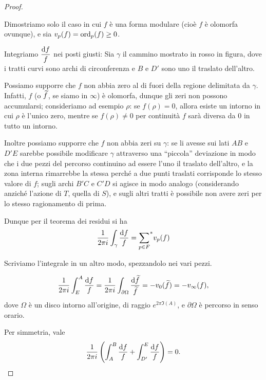 \begin{proof}
	\begin{figure}
		
	\end{figure}
	Dimostriamo solo il caso in cui $f$ è una forma modulare (cioè $f$ è olomorfa ovunque), e sia $v_p(f)=\text{ord}_p(f)\geq0$.
	
	Integriamo $\displaystyle \frac{\text{d} f}{f}$ nei posti giusti: Sia $\gamma$ il cammino mostrato in rosso in figura, dove i tratti curvi sono archi di circonferenza e $B$ e $D'$ sono uno il traslato dell'altro.
	
	Possiamo supporre che $f$ non abbia zero al di fuori della regione delimitata da $\gamma$.
	Infatti, $f$ (o $\widetilde{f}$, se siamo in $\infty$) è olomorfa, dunque gli zeri non possono accumularsi; consideriamo ad esempio $\rho$: se $f(\rho)=0$, allora esiste un intorno in cui $\rho$ è l'unico zero, mentre se $f(\rho)\neq0$ per continuità $f$ sarà diversa da $0$ in tutto un intorno.
	
	Inoltre possiamo supporre che $f$ non abbia zeri su $\gamma$: se li avesse sui lati $AB$ e $D'E$ sarebbe possibile modificare $\gamma$ attraverso una ``piccola'' deviazione in modo che i due pezzi del percorso continuino ad essere l'uno il traslato dell'altro, e la zona interna rimarrebbe la stessa perché a due punti traslati corrisponde lo stesso valore di $f$; sugli archi $B'C$ e $C'D$ si agisce in modo analogo (considerando anziché l'azione di $T$, quella di $S$), e sugli altri tratti è possibile non avere zeri per lo stesso ragionamento di prima.
	
	Dunque per il teorema dei residui si ha
	\begin{equation*}
		\frac{1}{2\pi i} \int_{\gamma} \frac{\text{d} f}{f}={\sum_{p\in F}}^{*}v_p(f)
	\end{equation*}
	
	Scriviamo l'integrale in un altro modo, spezzandolo nei vari pezzi.
	
	\begin{equation*}
		\frac{1}{2\pi i}\int_E^A\frac{\text{d} f}{f}=\frac{1}{2\pi i}\int_{\partial\Omega}\frac{\text{d} \widetilde{f}}{\widetilde{f}}=-v_0(\widetilde{f})=-v_\infty(f),
	\end{equation*}
	dove $\Omega$ è un disco intorno all'origine, di raggio $e^{2\pi \Im(A)}$, e $\partial\Omega$ è percorso in senso orario.
	
	Per simmetria, vale
	\begin{equation*}
		\frac{1}{2\pi i}\left( \int_A^B\frac{\text{d} f}{f} + \int_{D'}^E\frac{\text{d} f}{f} \right) = 0.
	\end{equation*}
	

\end{proof}
